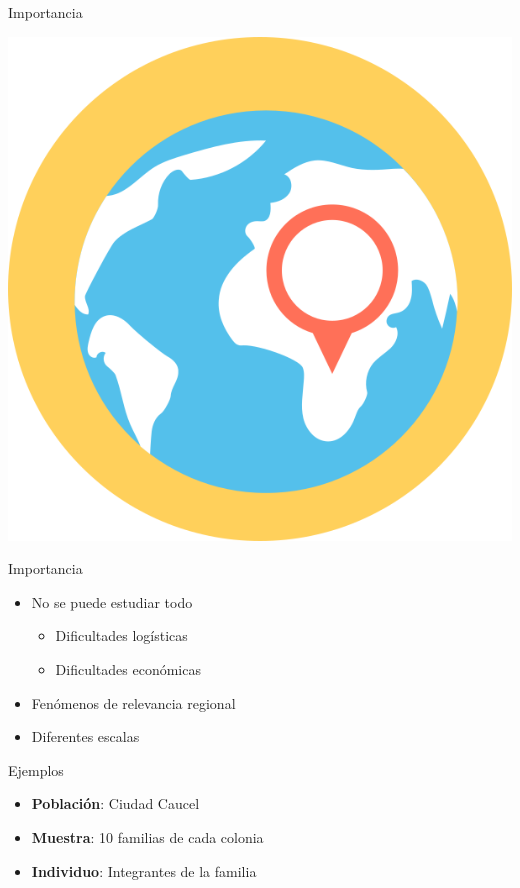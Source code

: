 \documentclass[
  11pt,
  ignorenonframetext,
]{beamer}
\providecommand{\tightlist}{%
  \setlength{\itemsep}{0pt}\setlength{\parskip}{0pt}}
\begin{document}
\begin{frame}{Importancia}
\protect\hypertarget{importancia}{}
\begin{center}\includegraphics[width=8.33in]{Figuras-Intro/mundo} \end{center}
\end{frame}

\begin{frame}{Importancia}
\protect\hypertarget{importancia-1}{}
\begin{itemize}
\item
  No se puede estudiar todo

  \begin{itemize}
  \tightlist
  \item
    Dificultades logísticas
  \item
    Dificultades económicas
  \end{itemize}
\item
  Fenómenos de relevancia regional
\item
  Diferentes escalas
\end{itemize}
\end{frame}

\begin{frame}{Ejemplos}
\protect\hypertarget{ejemplos}{}
\begin{itemize}
\tightlist
\item
  \textbf{Población}: Ciudad Caucel
\item
  \textbf{Muestra}: 10 familias de cada colonia
\item
  \textbf{Individuo}: Integrantes de la familia
\end{itemize}
\end{frame}
\end{document}
